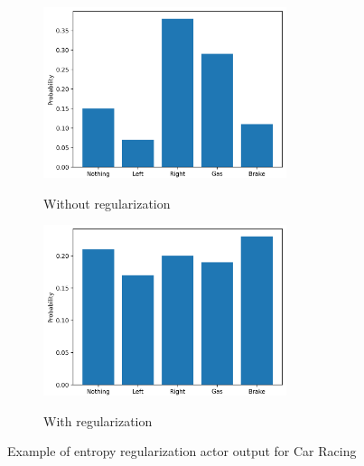 \begin{figure}[H]
  \captionsetup[subfigure]{justification=centering}
  \centering
  \begin{subfigure}[t]{0.47\linewidth}
    {\includegraphics[height=5cm]{figures/images/unregularized.png}}
    \caption{Without regularization}
  \end{subfigure}
  \hfill
  \begin{subfigure}[t]{0.47\linewidth}
    {\includegraphics[height=5cm]{figures/images/regularized.png}}
    \caption{With regularization}
  \end{subfigure}
  \caption[Entropy regularization graphs]{Example of entropy regularization actor output for Car Racing}
  \label{fig:entropy_regularization}
\end{figure}
